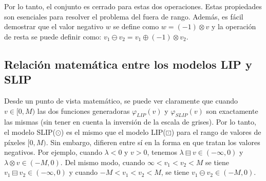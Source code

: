 Por lo tanto, el conjunto es cerrado para estas dos operaciones. Estas propiedades son esenciales para resolver el problema del fuera de rango. Además, es fácil demostrar que el valor negativo $w$ se define como $w = (-1)\otimes v$ y la operación de resta se puede definir como: $v_1\ominus v_2=v_1\oplus(-1)\otimes v_2$.

\subsection{Relación matemática entre los modelos LIP y SLIP}

Desde un punto de vista matemático, se puede ver claramente que cuando $v \in [0, M)$ las dos funciones generadoras $\varphi_{LIP}(v)$ y $\varphi_{SLIP}(v)$ son exactamente las mismas (sin tener en cuenta la inversi\'on de la escala de grises). Por lo tanto, el modelo SLIP($\odot$) es el mismo que el modelo LIP($\boxdot$) para el rango de valores de píxeles $[0, M)$. Sin embargo, difieren entre sí en la forma en que tratan los valores negativos.  Por ejemplo, cuando $\lambda < 0$ y $v > 0$, tenemos $\lambda\boxminus v \in (-\infty, 0)$ y $\lambda \otimes v \in (-M, 0)$. Del mismo modo, cuando $\infty < v_1 < v_2 < M$ se tiene $v_1 \boxminus v_2 \in (-\infty, 0)$ y cuando $-M < v_1 < v_2 < M$, se tiene $v_1\ominus v_2 \in (-M, 0)$. 
